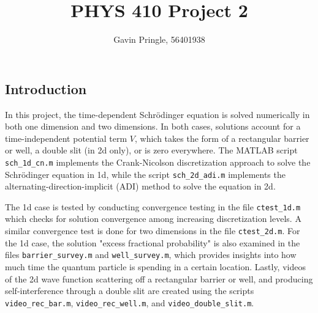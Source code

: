 \documentclass[10pt]{article}
\title{PHYS 410 Project 2}
\author{Gavin Pringle, 56401938}
\def\code#1{\texttt{#1}} %
\begin{document}
\maketitle


\subsection*{Introduction}

In this project, the time-dependent Schrödinger equation is solved numerically in both one dimension
and two dimensions. In both cases, solutions account for a time-independent potential term $V$, which
takes the form of a rectangular barrier or well, a double slit (in 2d only), or is zero everywhere. 
The MATLAB script \code{sch\_1d\_cn.m} implements the Crank-Nicolson discretization approach to solve 
the Schrödinger equation in 1d, while the script \code{sch\_2d\_adi.m} implements the 
alternating-direction-implicit (ADI) method to solve the equation in 2d. 

The 1d case is tested by conducting convergence testing in the file \code{ctest\_1d.m} which checks 
for solution convergence among increasing discretization levels. A similar convergence test is done 
for two dimensions in the file \code{ctest\_2d.m}. For the 1d case, the solution "excess fractional
probability" is also examined in the files \code{barrier\_survey.m} and \code{well\_survey.m}, which
provides insights into how much time the quantum particle is spending in a certain location. Lastly,
videos of the 2d wave function scattering off a rectangular barrier or well, and producing 
self-interference through a double slit are created using the scripts \code{video\_rec\_bar.m},
\code{video\_rec\_well.m}, and \code{video\_double\_slit.m}.
\end{document}
